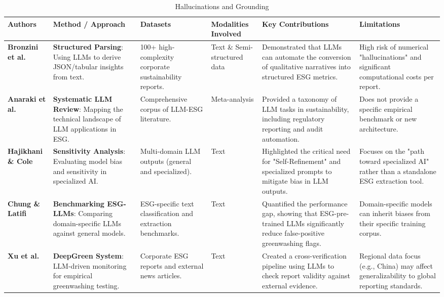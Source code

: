 \documentclass[english, online, cse, master]{dithesis}
\begin{document}
\begin{landscape}
\begin{table}[p]
\centering
\caption{Hallucinations and Grounding}
\label{tab:hallucinations-grounding}
\small
\renewcommand{\arraystretch}{1.2}
\begin{tabularx}{\linewidth}{|p{1.8cm}|p{3.5cm}|p{3.5cm}|p{1.8cm}|X|X|}
\hline
Authors & Method / Approach & Datasets & Modalities Involved & Key Contributions & Limitations \\ \hline
\textbf{Bronzini et al.}  \parencite{marco_bronzini_bf94d949} & \textbf{Structured Parsing}: Using LLMs to derive JSON/tabular insights from text. & 100+ high-complexity corporate sustainability reports. & Text \& Semi-structured data & Demonstrated that LLMs can automate the conversion of qualitative narratives into structured ESG metrics. & High risk of numerical "hallucinations" and significant computational costs per report. \\ \hline
\textbf{Anaraki et al.}  \parencite{seyed_alireza_mousavian_anaraki_b56a1c0f} & \textbf{Systematic LLM Review}: Mapping the technical landscape of LLM applications in ESG. & Comprehensive corpus of LLM-ESG literature. & Meta-analysis & Provided a taxonomy of LLM tasks in sustainability, including regulatory reporting and audit automation. & Does not provide a specific empirical benchmark or new architecture. \\ \hline
\textbf{Hajikhani \& Cole}  \parencite{arash_hajikhani_cbb2528f} & \textbf{Sensitivity Analysis}: Evaluating model bias and sensitivity in specialized AI. & Multi-domain LLM outputs (general and specialized). & Text & Highlighted the critical need for "Self-Refinement" and specialized prompts to mitigate bias in LLM outputs. & Focuses on the "path toward specialized AI" rather than a standalone ESG extraction tool. \\ \hline
\textbf{Chung \& Latifi}  \parencite{tae_sun_chung_e16a4c18} & \textbf{Benchmarking ESG-LLMs}: Comparing domain-specific LLMs against general models. & ESG-specific text classification and extraction benchmarks. & Text & Quantified the performance gap, showing that ESG-pre-trained LLMs significantly reduce false-positive greenwashing flags. & Domain-specific models can inherit biases from their specific training corpus. \\ \hline
\textbf{Xu et al.}  \parencite{chong_xu_bff21576} & \textbf{DeepGreen System}: LLM-driven monitoring for empirical greenwashing testing. & Corporate ESG reports and external news articles. & Text & Created a cross-verification pipeline using LLMs to check report validity against external evidence. & Regional data focus (e.g., China) may affect generalizability to global reporting standards. \\ \hline

\end{tabularx}
\end{table}
\end{landscape}
\end{document}
